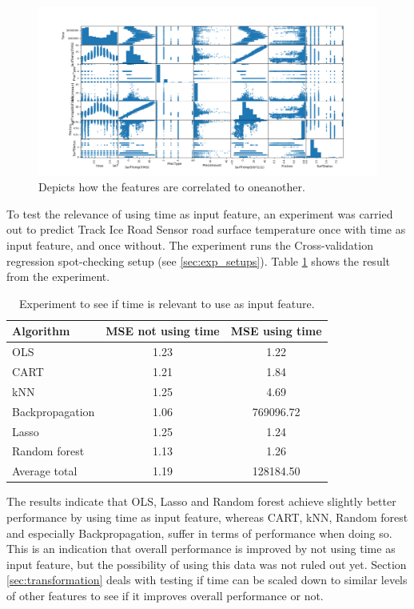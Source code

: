 \begin{figure}[H] 
	\centering
	\includegraphics[width=1\textwidth]{media/relationship_parameters_pre_noerr.png}
	\caption{Depicts how the features are correlated to oneanother.}
	\label{img:correlations_noerr}
\end{figure}

	To test the relevance of using time as input feature, an experiment was carried out to predict Track Ice Road Sensor road surface temperature once with time as input feature, and once without. The experiment runs the Cross-validation regression spot-checking setup (see \ref{sec:exp_setups}). Table \ref{table:timeinput} shows the result from the experiment.

	\begin{table}[H] %
	\centering
	\caption{Experiment to see if time is relevant to use as input feature. }
		\begin{tabular}[3]{l | c | c}
    			Algorithm & MSE not using time & MSE using time \\
    			\hline
			OLS & 1.23 & 1.22 \\
			CART & 1.21 & 1.84 \\
			kNN & 1.25 & 4.69 \\
			Backpropagation & 1.06 & 769096.72 \\
			Lasso & 1.25 & 1.24 \\
			Random forest & 1.13 & 1.26 \\
			\hline
			Average total & 1.19 & 128184.50
			\label{table:timeinput}
		\end{tabular}
	\end{table}

	The results indicate that OLS, Lasso and Random forest achieve slightly better performance by using time as input feature, whereas CART, kNN, Random forest and especially Backpropagation, suffer in terms of performance when doing so. This is an indication that overall performance is improved by not using time as input feature, but the possibility of using this data was not ruled out yet. Section \ref{sec:transformation} deals with testing if time can be scaled down to similar levels of other features to see if it improves overall performance or not.

